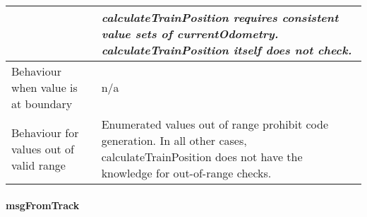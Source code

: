 \begin{longtable}{p{}p{}}
                     	&  \emph{calculateTrainPosition requires consistent value sets of currentOdometry. calculateTrainPosition itself does not check.}
\\

\midrule
Behaviour when value is at boundary	& n/a \\
\midrule
Behaviour for values out of valid range	& Enumerated values out of range prohibit code generation. In all other cases, calculateTrainPosition does not have the knowledge for out-of-range checks. \\
\bottomrule
\end{longtable}



\paragraph{msgFromTrack}

